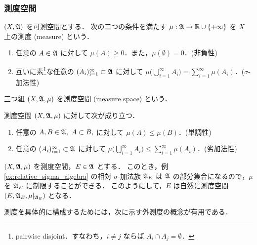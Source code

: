 \subsubsection{測度空間}

\begin{definition}
    $(X,\mathfrak{A})$ を可測空間とする．
    次の二つの条件を満たす $\mu:\mathfrak{A}\to\mathbb{R}\cup\{+\infty\}$ を $X$ 上の測度 (measure) という．
    \begin{enumerate}[label=\textsf{(M\arabic*)},align=left]
        \item\label{item:m1} 任意の $A\in\mathfrak{A}$ に対して $\mu(A)\ge0$．また，$\mu(\emptyset)=0$．\qquad (非負性)
        \item\label{item:m2} 互いに素\footnote{pairwise disjoint．すなわち，$i\ne j$ ならば $A_i\cap A_j=\emptyset$．}な任意の $(A_i)_{i=1}^\infty\subset\mathfrak{A}$ に対して
            $\displaystyle\mu\biggl(\bigcup_{i=1}^\infty A_i\biggr)=\sum_{i=1}^\infty\mu(A_i)$．\qquad ($\sigma$-加法性)
    \end{enumerate}
    三つ組 $(X,\mathfrak{A},\mu)$ を測度空間 (measure space) という．
\end{definition}

\begin{remark}
    測度空間 $(X,\mathfrak{A},\mu)$ に対して次が成り立つ．
    \begin{enumerate}
        \item 任意の $A,B\in\mathfrak{A},\ A\subset B,$ に対して $\mu(A)\le\mu(B)$．\qquad(単調性)
        \item 任意の $(A_i)_{i=1}^\infty\subset\mathfrak{A}$ に対して $\displaystyle\mu\biggl(\bigcup_{i=1}^\infty A_i\biggr)\le\sum_{i=1}^\infty\mu(A_i)$．\qquad(劣加法性)
    \end{enumerate}
\end{remark}

\begin{example}\label{ex:restriction_of_measure}
    $(X,\mathfrak{A},\mu)$ を測度空間，$E\in\mathfrak{A}$ とする．
    このとき，例 \ref{ex:relative_sigma_algebra} の相対 $\sigma$-加法族 $\mathfrak{A}_E$ は
    $\mathfrak{A}$ の部分集合になるので，$\mu$ を $\mathfrak{A}_E$ に制限することができる．
    このようにして，$E$ は自然に測度空間 $(E,\mathfrak{A}_E,\mu\vert_{\mathfrak{A}_E})$ となる．
\end{example}

測度を具体的に構成するためには，次に示す外測度の概念が有用である．

